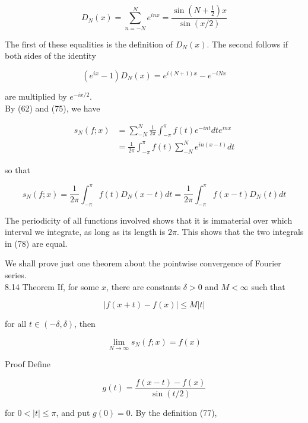 \documentclass[10pt]{article}
\begin{document}
\begin{equation*}
D_{N}(x)=\sum_{n=-N}^{N} e^{i n x}=\frac{\sin \left(N+\frac{1}{2}\right) x}{\sin (x / 2)} \tag{77}
\end{equation*}


The first of these equalities is the definition of $D_{N}(x)$. The second follows if both sides of the identity

$$
\left(e^{i x}-1\right) D_{N}(x)=e^{i(N+1) x}-e^{-i N x}
$$

are multiplied by $e^{-i x / 2}$.\\
By (62) and (75), we have

$$
\begin{aligned}
s_{N}(f ; x) & =\sum_{-N}^{N} \frac{1}{2 \pi} \int_{-\pi}^{\pi} f(t) e^{-i n t} d t e^{i n x} \\
& =\frac{1}{2 \pi} \int_{-\pi}^{\pi} f(t) \sum_{-N}^{N} e^{i n(x-t)} d t
\end{aligned}
$$

so that


\begin{equation*}
s_{N}(f ; x)=\frac{1}{2 \pi} \int_{-\pi}^{\pi} f(t) D_{N}(x-t) d t=\frac{1}{2 \pi} \int_{-\pi}^{\pi} f(x-t) D_{N}(t) d t \tag{78}
\end{equation*}


The periodicity of all functions involved shows that it is immaterial over which interval we integrate, as long as its length is $2 \pi$. This shows that the two integrals in (78) are equal.

We shall prove just one theorem about the pointwise convergence of Fourier series.\\
8.14 Theorem If, for some $x$, there are constants $\delta>0$ and $M<\infty$ such that


\begin{equation*}
|f(x+t)-f(x)| \leq M|t| \tag{79}
\end{equation*}


for all $t \in(-\delta, \delta)$, then


\begin{equation*}
\lim _{N \rightarrow \infty} s_{N}(f ; x)=f(x) \tag{80}
\end{equation*}


Proof Define


\begin{equation*}
g(t)=\frac{f(x-t)-f(x)}{\sin (t / 2)} \tag{81}
\end{equation*}


for $0<|t| \leq \pi$, and put $g(0)=0$. By the definition (77),
\end{document}
